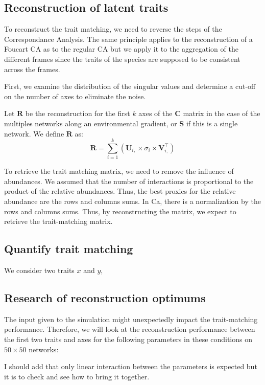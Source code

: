 \subsection{Reconstruction of latent traits}

To reconstruct the trait matching, we need to reverse the steps of the Correspondance Analysis. The same principle applies to the reconstruction of a Foucart CA as to the regular CA but we apply it to the  aggregation of the different frames since the traits of the species are supposed to be consistent across the frames.

First, we examine the distribution of the singular values and determine a cut-off on the number of axes to eliminate the noise.

Let $\mathbf{R}$ be the reconstruction for the first $k$ axes of the $\mathbf{C}$ matrix in the case of the multiples networks along an environmental gradient, or $\mathbf{S}$ if this is a single network. We define $\mathbf{R}$ as:
$$
    \mathbf{R} = \sum_{i=1} ^{k}\left( \mathbf{U}_{i,} \times \sigma_i \times \mathbf{V}_{i,}^\intercal \right)
$$

To retrieve the trait matching matrix, we need to remove the influence of abundances. We assumed that the number of interactions is proportional to the product of the relative abundances.  Thus, the best proxies for the relative abundance are the rows and columns sums.
In Ca, there is a normalization by the rows and columns sums. Thus, by reconstructing the matrix, we expect to retrieve the trait-matching matrix.

\subsection{Quantify trait matching}

We consider two traits $x$ and $y$,


\subsection{Research of reconstruction optimums}

The input given to the simulation might unexpectedly impact the trait-matching performance. Therefore, we will look at the reconstruction performance between the first two traits and axes for the following parameters in these conditions on $50\times50$ networks:

I should add that only linear interaction between the parameters is expected but it is to check and see how to bring it together.

